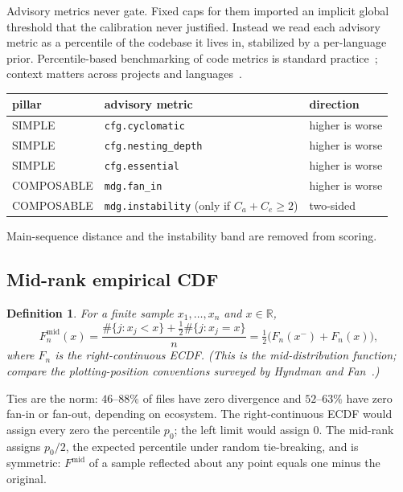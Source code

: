 \documentclass[11pt]{article}
\newtheorem{definition}{Definition}
\theoremstyle{remark}
\newcommand{\R}{\mathbb{R}}
\begin{document}
Advisory metrics never gate. Fixed caps for them imported an implicit global
threshold that the calibration never justified. Instead we read each advisory
metric as a percentile of the codebase it lives in, stabilized by a
per-language prior. Percentile-based benchmarking of code metrics is standard
practice~\cite{alves2010,alves2011,oliveira2014,foucault2014}; context matters
across projects and languages~\cite{zhang2013,gil2016}.

\begin{center}
\begin{tabular}{lll}
\toprule
pillar & advisory metric & direction \\
\midrule
SIMPLE & \texttt{cfg.cyclomatic} & higher is worse \\
SIMPLE & \texttt{cfg.nesting\_depth} & higher is worse \\
SIMPLE & \texttt{cfg.essential} & higher is worse \\
COMPOSABLE & \texttt{mdg.fan\_in} & higher is worse \\
COMPOSABLE & \texttt{mdg.instability} (only if $C_a + C_e \ge 2$) & two-sided \\
\bottomrule
\end{tabular}
\end{center}

Main-sequence distance and the instability band are removed from scoring.

\subsection{Mid-rank empirical CDF}

\begin{definition}
For a finite sample $x_1, \dots, x_n$ and $x \in \R$,
\[
F_n^{\mathrm{mid}}(x) = \frac{\#\{j : x_j < x\} + \tfrac12 \#\{j : x_j = x\}}{n}
= \tfrac12\bigl(F_n(x^-) + F_n(x)\bigr),
\]
where $F_n$ is the right-continuous ECDF. (This is the mid-distribution
function; compare the plotting-position conventions surveyed by Hyndman and
Fan~\cite{hyndman1996}.)
\end{definition}

Ties are the norm: $46$--$88\%$ of files have zero divergence and $52$--$63\%$
have zero fan-in or fan-out, depending on ecosystem. The right-continuous ECDF
would assign every zero the percentile $p_0$; the left limit would assign $0$.
The mid-rank assigns $p_0/2$, the expected percentile under random tie-breaking,
and is symmetric: $F^{\mathrm{mid}}$ of a sample reflected about any point
equals one minus the original.
\end{document}
